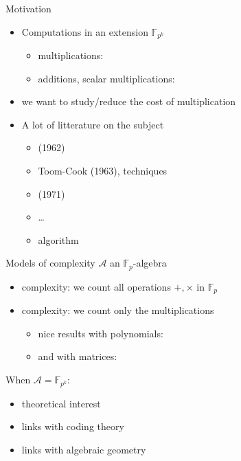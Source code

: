\documentclass[xcolor=x11names,compress, aspectratio=43]{beamer}
\begin{document}
\begin{frame}{Motivation}
  \begin{itemize}
    \item Computations in an extension $\mathbb{F}_{p^k}$%
      \begin{itemize}
        \item<2-> multiplications:  \bad
        \item<2-> additions, scalar multiplications:  \good
      \end{itemize}
    \item<3-> we want to study/reduce the cost of multiplication
    \item<4-> A lot of litterature on the subject
      \begin{itemize}
        \item<5->  (1962)
        \item<6-> Toom-Cook (1963),  techniques
        \item<7->  (1971)
        \item<8-> \dots
        \item<9->  algorithm 
      \end{itemize}
  \end{itemize}
\end{frame}

\begin{frame}{Models of complexity}
  $\mathcal A$ an $\mathbb{F}_p$-algebra
  \begin{itemize}
      \item {} complexity: we count all operations $+, \times$ in $\mathbb{F}_p$
      \item {} complexity: we count only the multiplications
        \begin{itemize}
          \item nice results with polynomials: 
          \item and with matrices: 
        \end{itemize}
  \end{itemize}

  When $\mathcal A=\mathbb{F}_{p^k}$:
  \begin{itemize}
    \item theoretical interest
    \item links with coding theory
    \item links with algebraic geometry
  \end{itemize}
\end{frame}
\end{document}
